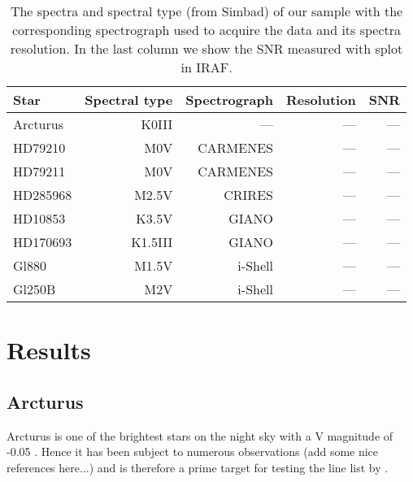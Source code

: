 \documentclass{aa}
\begin{document}
\begin{table*}[htb!]
    \caption{The spectra and spectral type (from Simbad) of our sample with
             the corresponding spectrograph used to acquire the data and its
             spectra resolution. In the last column we show the SNR measured
             with splot in IRAF.}
    \label{tab:data}
    \centering
    \begin{tabular}{lrrrr}
      \hline\hline
        Star      & Spectral type & Spectrograph  & Resolution   &  SNR  \\
      \hline
        Arcturus  &      K0III    &  ---          &    ---       &  ---  \\
        HD79210   &      M0V      & CARMENES      &    ---       &  ---  \\
        HD79211   &      M0V      & CARMENES      &    ---       &  ---  \\
        HD285968  &      M2.5V    & CRIRES        &    ---       &  ---  \\
        HD10853   &      K3.5V    & GIANO         &    ---       &  ---  \\
        HD170693  &      K1.5III  & GIANO         &    ---       &  ---  \\
        Gl880     &      M1.5V    & i-Shell       &    ---       &  ---  \\
        Gl250B    &      M2V      & i-Shell       &    ---       &  ---  \\
    \end{tabular}
\end{table*}



\section{Results}
\label{sec:results}



\subsection{Arcturus}
\label{sec:derived_parameters_of_the_sun}
Arcturus is one of the brightest stars on the night sky with a V magnitude of
-0.05 \citep{Ducati2002}. Hence it has been subject to numerous observations
(add some nice references here...) and is therefore a prime target for testing
the line list by \cite{Andreasen2016}.
\end{document}
